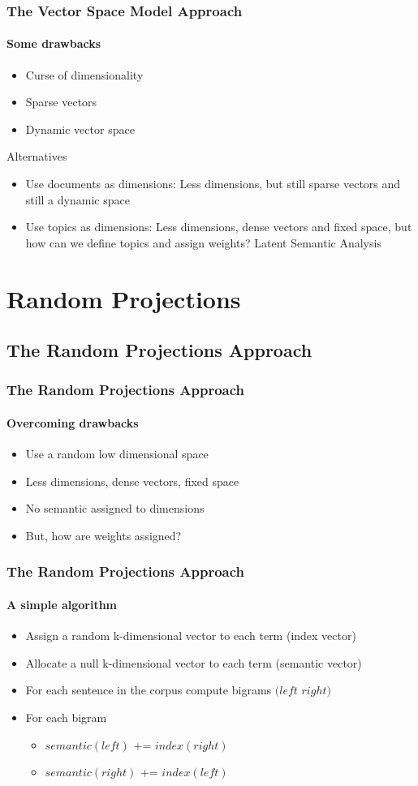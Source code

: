 \documentclass{beamer}
\begin{document}
\begin{frame}
	\frametitle{The Vector Space Model Approach}
	\framesubtitle{Some drawbacks}
  \begin{itemize}
    \item	Curse of dimensionality
    \item	Sparse vectors
    \item	Dynamic vector space
      \end{itemize}
      \bigskip
      Alternatives
  \begin{itemize}
    \item	Use documents as dimensions: Less dimensions, but still sparse vectors and still a dynamic space
    \item	Use topics as dimensions: Less dimensions, dense vectors and fixed space, but how can we define topics and assign weights?  Latent Semantic Analysis
  \end{itemize}
\end{frame}

\section{Random Projections}

\subsection{The Random Projections Approach}
\begin{frame}
	\frametitle{The Random Projections Approach}
	\framesubtitle{Overcoming drawbacks}
	\begin{itemize}
	\item Use a random low dimensional space
	\item Less dimensions, dense vectors, fixed space
	\item No semantic assigned to dimensions
	\item But, how are weights assigned?
	\end{itemize}
\end{frame}

\begin{frame}
	\frametitle{The Random Projections Approach}
	\framesubtitle{A simple algorithm }
	\begin{itemize}
		\item Assign a random k-dimensional vector to each term (index vector)
		\item Allocate a null k-dimensional vector to each term (semantic vector)
		\item For each sentence in the corpus compute bigrams $(left$ $right)$
		\item For each bigram 
		\begin{itemize}
		  \item $semantic(left)$ += $index(right)$
		  \item $semantic(right)$ += $index(left)$
		\end{itemize}
	\end{itemize}
\end{frame}	
\end{document}
